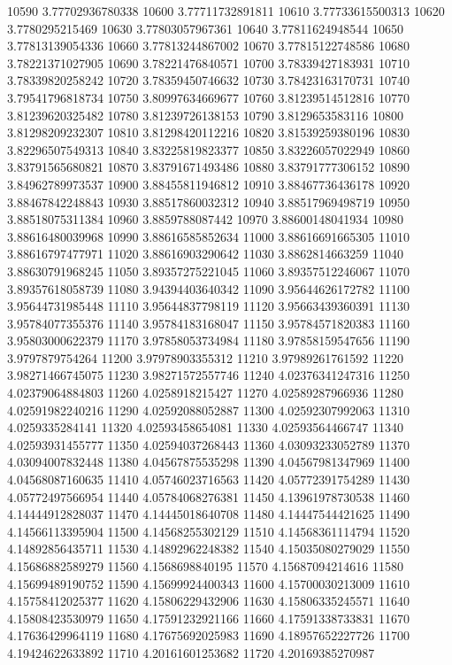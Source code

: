 {10590 3.77702936780338
10600 3.77711732891811
10610 3.77733615500313
10620 3.7780295215469
10630 3.77803057967361
10640 3.77811624948544
10650 3.77813139054336
10660 3.77813244867002
10670 3.77815122748586
10680 3.78221371027905
10690 3.78221476840571
10700 3.78339427183931
10710 3.78339820258242
10720 3.78359450746632
10730 3.78423163170731
10740 3.79541796818734
10750 3.80997634669677
10760 3.81239514512816
10770 3.81239620325482
10780 3.81239726138153
10790 3.8129653583116
10800 3.81298209232307
10810 3.81298420112216
10820 3.81539259380196
10830 3.82296507549313
10840 3.83225819823377
10850 3.83226057022949
10860 3.83791565680821
10870 3.83791671493486
10880 3.83791777306152
10890 3.84962789973537
10900 3.88455811946812
10910 3.88467736436178
10920 3.88467842248843
10930 3.88517860032312
10940 3.88517969498719
10950 3.88518075311384
10960 3.8859788087442
10970 3.88600148041934
10980 3.88616480039968
10990 3.88616585852634
11000 3.88616691665305
11010 3.88616797477971
11020 3.88616903290642
11030 3.8862814663259
11040 3.88630791968245
11050 3.89357275221045
11060 3.89357512246067
11070 3.89357618058739
11080 3.94394403640342
11090 3.95644626172782
11100 3.95644731985448
11110 3.95644837798119
11120 3.95663439360391
11130 3.95784077355376
11140 3.95784183168047
11150 3.95784571820383
11160 3.95803000622379
11170 3.97858053734984
11180 3.97858159547656
11190 3.9797879754264
11200 3.97978903355312
11210 3.97989261761592
11220 3.98271466745075
11230 3.98271572557746
11240 4.02376341247316
11250 4.02379064884803
11260 4.0258918215427
11270 4.02589287966936
11280 4.02591982240216
11290 4.02592088052887
11300 4.02592307992063
11310 4.0259335284141
11320 4.02593458654081
11330 4.02593564466747
11340 4.02593931455777
11350 4.02594037268443
11360 4.03093233052789
11370 4.03094007832448
11380 4.04567875535298
11390 4.04567981347969
11400 4.04568087160635
11410 4.05746023716563
11420 4.05772391754289
11430 4.05772497566954
11440 4.05784068276381
11450 4.13961978730538
11460 4.14444912828037
11470 4.14445018640708
11480 4.14447544421625
11490 4.14566113395904
11500 4.14568255302129
11510 4.14568361114794
11520 4.14892856435711
11530 4.14892962248382
11540 4.15035080279029
11550 4.15686882589279
11560 4.1568698840195
11570 4.15687094214616
11580 4.15699489190752
11590 4.15699924400343
11600 4.15700030213009
11610 4.15758412025377
11620 4.15806229432906
11630 4.15806335245571
11640 4.15808423530979
11650 4.17591232921166
11660 4.17591338733831
11670 4.17636429964119
11680 4.17675692025983
11690 4.18957652227726
11700 4.19424622633892
11710 4.20161601253682
11720 4.20169385270987
}

